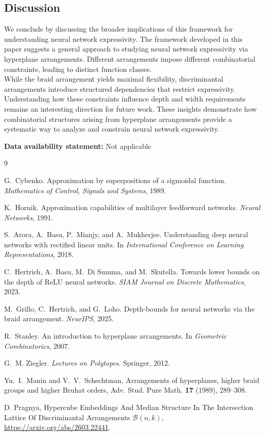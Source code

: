 \documentclass{amsart}
\theoremstyle{definition}
\begin{document}
\subsection{Discussion}
We conclude by discussing the broader implications of this framework for understanding neural network expressivity.
The framework developed in this paper suggests a general approach to studying neural network expressivity via hyperplane arrangements. Different arrangements impose different combinatorial constraints, leading to distinct function classes.\\
\noindent
While the braid arrangement yields maximal flexibility, discriminantal arrangements introduce structured dependencies that restrict expressivity. Understanding how these constraints influence depth and width requirements remains an interesting direction for future work.
These insights demonstrate how combinatorial structures arising from hyperplane arrangements provide a systematic way to analyze and constrain neural network expressivity.

\bigskip
\noindent
\textbf{Data availability statement:} Not applicable\\



\begin{thebibliography}{9}



G.~Cybenko.
\newblock Approximation by superpositions of a sigmoidal function.
\newblock \emph{Mathematics of Control, Signals and Systems}, 1989.

K.~Hornik.
\newblock Approximation capabilities of multilayer feedforward networks.
\newblock \emph{Neural Networks}, 1991.

S.~Arora, A.~Basu, P.~Mianjy, and A.~Mukherjee.
\newblock Understanding deep neural networks with rectified linear units.
\newblock In \emph{International Conference on Learning Representations}, 2018.

C.~Hertrich, A.~Basu, M.~Di Summa, and M.~Skutella.
\newblock Towards lower bounds on the depth of ReLU neural networks.
\newblock \emph{SIAM Journal on Discrete Mathematics}, 2023.

M.~Grillo, C.~Hertrich, and G.~Loho.
\newblock Depth-bounds for neural networks via the braid arrangement.
\newblock \emph{NeurIPS}, 2025.

R.~Stanley.
\newblock An introduction to hyperplane arrangements.
\newblock In \emph{Geometric Combinatorics}, 2007.

G.~M. Ziegler.
\newblock \emph{Lectures on Polytopes}.
\newblock Springer, 2012.

Yu.~I.~Manin and V.~V.~Schechtman,
\newblock Arrangements of hyperplanes, higher braid groups and higher Bruhat orders,
\newblock Adv. Stud. Pure Math. \textbf{17} (1989), 289--308.

D. Pragnya, 
\newblock Hypercube Embeddings And Median Structure In The Intersection Lattice Of Discriminantal Arrangements $\mathcal{B}(n,k)$, 
\newblock\url{https://arxiv.org/abs/2603.22441}.
\end{thebibliography}
\end{document}

